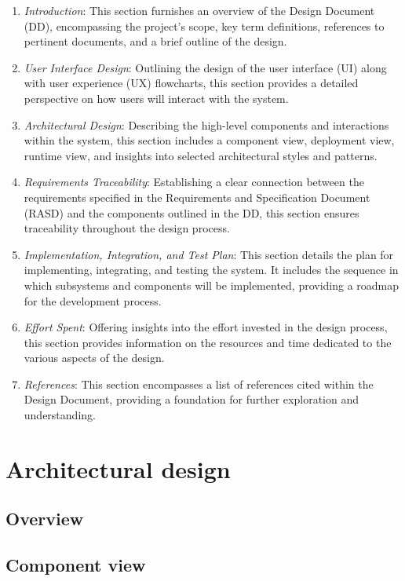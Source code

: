 \documentclass[12pt, a4paper]{report}
\begin{document}
    \begin{enumerate}
        \item \textit{Introduction}: This section furnishes an overview of the Design Document (DD), encompassing the project's scope, key term definitions, references to pertinent documents, and a brief outline of the design. 
        \item \textit{User Interface Design}: Outlining the design of the user interface (UI) along with user experience (UX) flowcharts, this section provides a detailed perspective on how users will interact with the system. 
        \item \textit{Architectural Design}: Describing the high-level components and interactions within the system, this section includes a component view, deployment view, runtime view, and insights into selected architectural styles and patterns.
        \item \textit{Requirements Traceability}: Establishing a clear connection between the requirements specified in the Requirements and Specification Document (RASD) and the components outlined in the DD, this section ensures traceability throughout the design process.
        \item \textit{Implementation, Integration, and Test Plan}: This section details the plan for implementing, integrating, and testing the system. It includes the sequence in which subsystems and components will be implemented, providing a roadmap for the development process.
        \item \textit{Effort Spent}: Offering insights into the effort invested in the design process, this section provides information on the resources and time dedicated to the various aspects of the design.                 
        \item \textit{References}: This section encompasses a list of references cited within the Design Document, providing a foundation for further exploration and understanding.
    \end{enumerate}   
    
\newpage 

\chapter{Architectural design}
    \section{Overview}
    \section{Component view}
\end{document}
